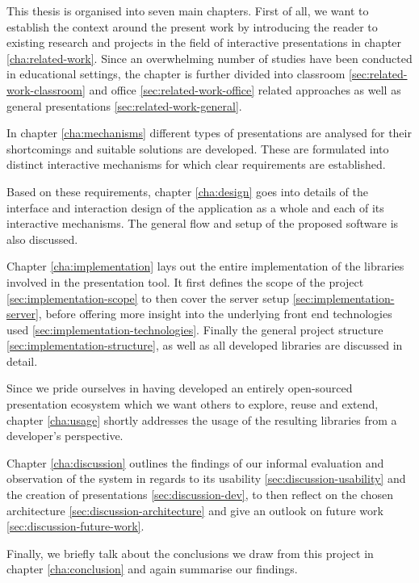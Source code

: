 This thesis is organised into seven main chapters. First of all, we want to establish the context around the present work by introducing the reader to existing research and projects in the field of interactive presentations in chapter \ref{cha:related-work}. Since an overwhelming number of studies have been conducted in educational settings, the chapter is further divided into classroom \ref{sec:related-work-classroom} and office \ref{sec:related-work-office} related approaches as well as general presentations \ref{sec:related-work-general}.

In chapter \ref{cha:mechanisms} different types of presentations are analysed for their shortcomings and suitable solutions are developed. These are formulated into distinct interactive mechanisms for which clear requirements are established.

Based on these requirements, chapter \ref{cha:design} goes into details of the interface and interaction design of the application as a whole and each of its interactive mechanisms. The general flow and setup of the proposed software is also discussed.

Chapter \ref{cha:implementation} lays out the entire implementation of the libraries involved in the presentation tool. It first defines the scope of the project \ref{sec:implementation-scope} to then cover the server setup \ref{sec:implementation-server}, before offering more insight into the underlying front end technologies used \ref{sec:implementation-technologies}. Finally the general project structure \ref{sec:implementation-structure}, as well as all developed libraries are discussed in detail.

Since we pride ourselves in having developed an entirely open-sourced presentation ecosystem which we want others to explore, reuse and extend, chapter \ref{cha:usage} shortly addresses the usage of the resulting libraries from a developer's perspective.

Chapter \ref{cha:discussion} outlines the findings of our informal evaluation and observation of the system in regards to its usability \ref{sec:discussion-usability} and the creation of presentations \ref{sec:discussion-dev}, to then reflect on the chosen architecture \ref{sec:discussion-architecture} and give an outlook on future work \ref{sec:discussion-future-work}.

Finally, we briefly talk about the conclusions we draw from this project in chapter \ref{cha:conclusion} and again summarise our findings.